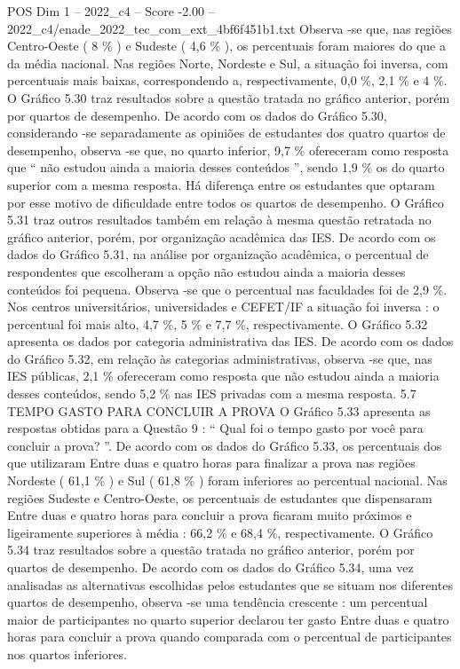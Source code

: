 \begin{textsample}{POS Dim 1 – 2022\_c4 – Score -2.00 – 2022\_c4/enade\_2022\_tec\_com\_ext\_4bf6f451b1.txt}
Observa -se que, nas regiões Centro-Oeste ( 8 \% ) e Sudeste ( 4,6 \% ), os percentuais foram maiores do que a da média nacional.
Nas regiões Norte, Nordeste e Sul, a situação foi inversa, com percentuais mais baixas, correspondendo a, respectivamente, 0,0 \%, 2,1 \% e 4 \%.
O Gráfico 5.30 traz resultados sobre a questão tratada no gráfico anterior, porém por quartos de desempenho.
De acordo com os dados do Gráfico 5.30, considerando -se separadamente as opiniões de estudantes dos quatro quartos de desempenho, observa -se que, no quarto inferior, 9,7 \% ofereceram como resposta que “ não estudou ainda a maioria desses conteúdos ”, sendo 1,9 \% os do quarto superior com a mesma resposta.
Há diferença entre os estudantes que optaram por esse motivo de dificuldade entre todos os quartos de desempenho.
O Gráfico 5.31 traz outros resultados também em relação à mesma questão retratada no gráfico anterior, porém, por organização acadêmica das IES.
De acordo com os dados do Gráfico 5.31, na análise por organização acadêmica, o percentual de respondentes que escolheram a opção não estudou ainda a maioria desses conteúdos foi pequena.
Observa -se que o percentual nas faculdades foi de 2,9 \%.
Nos centros universitários, universidades e CEFET/IF a situação foi inversa : o percentual foi mais alto, 4,7 \%, 5 \% e 7,7 \%, respectivamente.
O Gráfico 5.32 apresenta os dados por categoria administrativa das IES.
De acordo com os dados do Gráfico 5.32, em relação às categorias administrativas, observa -se que, nas IES públicas, 2,1 \% ofereceram como resposta que não estudou ainda a maioria desses conteúdos, sendo 5,2 \% nas IES privadas com a mesma resposta. 5.7 TEMPO GASTO PARA CONCLUIR A PROVA O Gráfico 5.33 apresenta as respostas obtidas para a Questão 9 : “ Qual foi o tempo gasto por você para concluir a prova? ”.
De acordo com os dados do Gráfico 5.33, os percentuais dos que utilizaram Entre duas e quatro horas para finalizar a prova nas regiões Nordeste ( 61,1 \% ) e Sul ( 61,8 \% ) foram inferiores ao percentual nacional.
Nas regiões Sudeste e Centro-Oeste, os percentuais de estudantes que dispensaram Entre duas e quatro horas para concluir a prova ficaram muito próximos e ligeiramente superiores à média : 66,2 \% e 68,4 \%, respectivamente.
O Gráfico 5.34 traz resultados sobre a questão tratada no gráfico anterior, porém por quartos de desempenho.
De acordo com os dados do Gráfico 5.34, uma vez analisadas as alternativas escolhidas pelos estudantes que se situam nos diferentes quartos de desempenho, observa -se uma tendência crescente : um percentual maior de participantes no quarto superior declarou ter gasto Entre duas e quatro horas para concluir a prova quando comparada com o percentual de participantes nos quartos inferiores.

\end{textsample}
